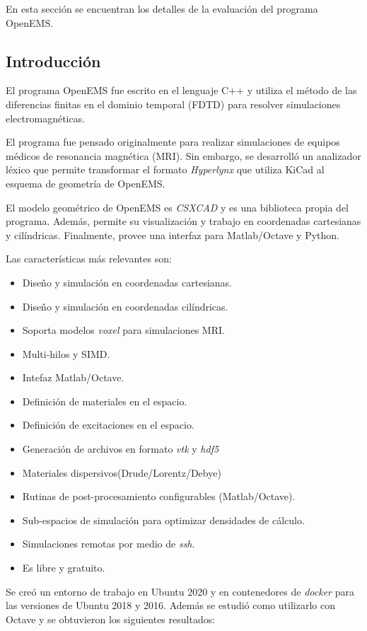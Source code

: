 \documentclass[
    11pt,
    spanish,
    a4paper
]{article}
\begin{document}
En esta sección se encuentran los detalles de la evaluación del programa OpenEMS.

\subsection{Introducción}

El programa OpenEMS fue escrito en el lenguaje C++ y utiliza el método de las diferencias finitas en el dominio temporal (FDTD) para resolver simulaciones electromagnéticas.

El programa fue pensado originalmente para realizar simulaciones de equipos médicos de resonancia magnética (MRI).
Sin embargo, se desarrolló un analizador léxico que permite transformar el formato \emph{Hyperlynx} que utiliza KiCad al esquema de geometría de OpenEMS.

El modelo geométrico de OpenEMS es \emph{CSXCAD} y es una biblioteca propia del programa.
Además, permite su visualización y trabajo en coordenadas cartesianas y cilíndricas.
Finalmente, provee una interfaz para Matlab/Octave y Python.

Las características más relevantes son:

\begin{itemize}
	\item Diseño y simulación en coordenadas cartesianas.
	\item Diseño y simulación en coordenadas cilíndricas.
	\item Soporta modelos \emph{voxel} para simulaciones MRI.
	\item Multi-hilos y SIMD.
	\item Intefaz Matlab/Octave.
	\item Definición de materiales en el espacio.
	\item Definición de excitaciones en el espacio.
	\item Generación de archivos en formato \emph{vtk} y \emph{hdf5}
	\item Materiales dispersivos(Drude/Lorentz/Debye)
	\item Rutinas de post-procesamiento configurables (Matlab/Octave).
	\item Sub-espacios de simulación para optimizar densidades de cálculo.
	\item Simulaciones remotas por medio de \emph{ssh}.
	\item Es libre y gratuito.
\end{itemize}

Se creó un entorno de trabajo en Ubuntu 2020 y en contenedores de \emph{docker} para las versiones de Ubuntu 2018 y 2016.
Además se estudió como utilizarlo con Octave y se obtuvieron los siguientes resultados:
\end{document}

